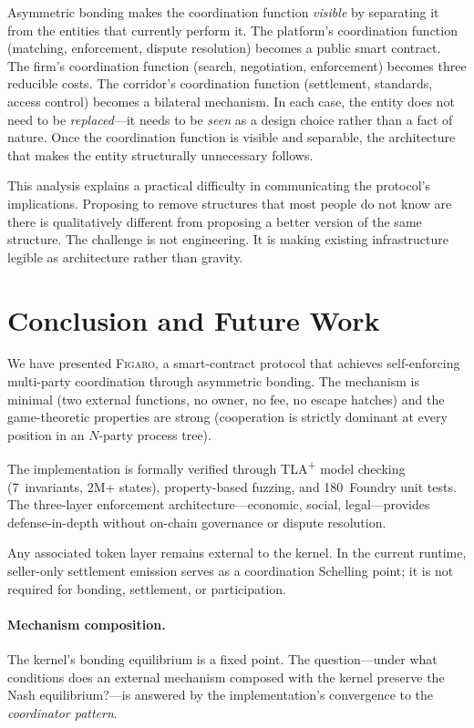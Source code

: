 \documentclass[11pt,a4paper]{article}
\theoremstyle{definition}
\theoremstyle{remark}
\newcommand{\figaro}{\textsc{Figaro}}
\begin{document}
Asymmetric bonding makes the coordination function \emph{visible} by
separating it from the entities that currently perform it. The platform's
coordination function (matching, enforcement, dispute resolution)
becomes a public smart contract. The firm's coordination function
(search, negotiation, enforcement) becomes three reducible costs. The
corridor's coordination function (settlement, standards, access
control) becomes a bilateral mechanism. In each case, the entity does
not need to be \emph{replaced}---it needs to be \emph{seen} as a design
choice rather than a fact of nature. Once the coordination function is
visible and separable, the architecture that makes the entity
structurally unnecessary follows.

This analysis explains a practical difficulty in communicating the
protocol's implications. Proposing to remove structures that most
people do not know are there is qualitatively different from proposing
a better version of the same structure. The challenge is not
engineering. It is making existing infrastructure legible as
architecture rather than gravity.

\section{Conclusion and Future Work}
\label{sec:conclusion}

We have presented \figaro{}, a smart-contract protocol that achieves
self-enforcing multi-party coordination through asymmetric bonding. The
mechanism is minimal (two external functions, no owner, no fee, no
escape hatches) and the game-theoretic properties are strong (cooperation
is strictly dominant at every position in an $N$-party process tree).

The implementation is formally verified through TLA\textsuperscript{+}
model checking (7~invariants, 2M+ states), property-based fuzzing, and
180~Foundry unit tests. The three-layer enforcement architecture---economic,
social, legal---provides defense-in-depth without on-chain governance or
dispute resolution.

Any associated token layer remains external to the kernel. In the
current runtime, seller-only settlement emission serves as a
coordination Schelling point; it is not required for bonding,
settlement, or participation.

\paragraph{Mechanism composition.}
The kernel's bonding equilibrium is a fixed point. The question---under
what conditions does an external mechanism composed with the kernel
preserve the Nash equilibrium?---is answered by the implementation's
convergence to the \emph{coordinator pattern}.
\end{document}
